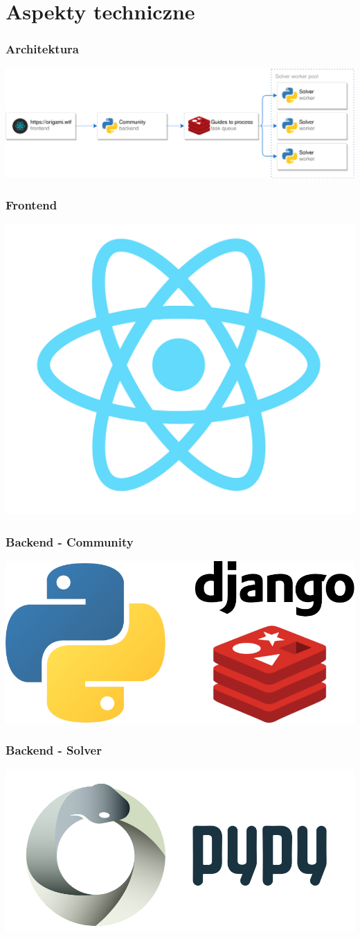 \documentclass{beamer}
\begin{document}
\section{Aspekty techniczne}
\begin{frame}
  \frametitle{Architektura}
  \includegraphics[width=\linewidth]{assets/architecture.png}
\end{frame}
\begin{frame}
  \frametitle{Frontend}
  \centering
  \includegraphics[width=0.3\linewidth]{assets/react-logo.png}
\end{frame}
\begin{frame}
  \frametitle{Backend - Community}
  \centering
  \includegraphics[width=0.7\linewidth]{assets/community-stack.png} \\
\end{frame}
\begin{frame}
  \frametitle{Backend - Solver}
  \centering
  \includegraphics[width=0.5\linewidth]{assets/pypy-logo.png}
\end{frame}
\end{document}
